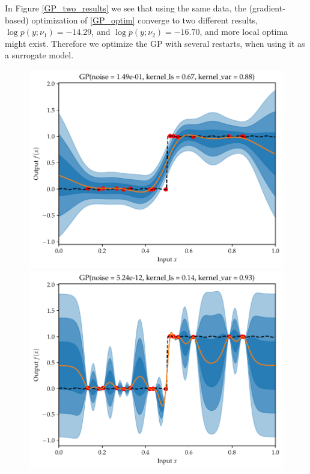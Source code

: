 In Figure \ref{GP_two_results} we see that using the same data, the (gradient-based) optimization of \eqref{GP_optim} converge
to two different results, $\log p(y;\nu_1) = -14.29$, and $\log p(y;\nu_2) = -16.70$, and more local optima might exist. Therefore
we optimize the GP with several restarts, when using it as a surrogate model. 

\begin{figure}[H]
    \centering
    \begin{minipage}[b]{0.49\textwidth}
     \includegraphics[width=\textwidth]{Pictures/GP_vs_BNN1.pdf}
    \end{minipage}
    \hfill
    \begin{minipage}[b]{0.49\textwidth}
      \includegraphics[width=\textwidth]{Pictures/GP_vs_BNN1_b.pdf}

\end{minipage}
\end{figure}
